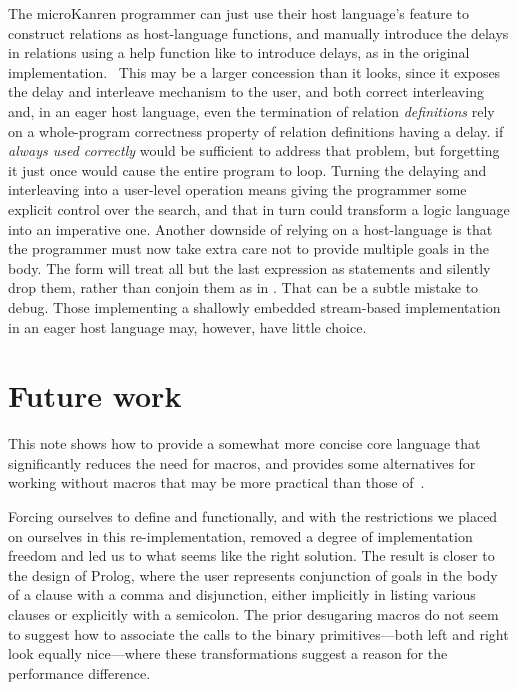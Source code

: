 \documentclass[sigplan,balance,pbalance,natbib=false]{acmart}
\begin{document}
The microKanren programmer can just use their host
language's  feature to construct relations as
host-language functions, and manually introduce the delays in
relations using a help function like  to introduce
delays, as in the original implementation.~\cite{hemann2013muKanren}
This may be a larger concession than it looks, since it exposes the
delay and interleave mechanism to the user, and both correct
interleaving and, in an eager host language, even the termination of
relation \emph{definitions} rely on a whole-program correctness
property of relation definitions having a delay.  if
\emph{always used correctly} would be sufficient to address that
problem, but forgetting it just once would cause the entire program to
loop. Turning the delaying and interleaving into a user-level
operation means giving the programmer some explicit control over the
search, and that in turn could transform a logic language into an
imperative one. Another downside of relying on a
host-language  is that the programmer must now take
extra care not to provide multiple goals in the body.
The  form will treat all but the last expression as
statements and silently drop them, rather than conjoin them as
in . That can be a subtle mistake to debug. Those
implementing a shallowly embedded stream-based implementation in an
eager host language may, however, have little choice.

\section{Future work}\label{sec:conclusion}

This note shows how to provide a somewhat more concise core language
that significantly reduces the need for macros, and provides some
alternatives for working without macros that may be more practical
than those of~\citeauthor{hemann2013muKanren}.

Forcing ourselves to define  and 
functionally, and with the restrictions we placed on ourselves in this
re-implementation, removed a degree of implementation freedom and led
us to what seems like the right solution. The result is closer to the
design of Prolog, where the user represents conjunction of goals in
the body of a clause with a comma and disjunction, either implicitly
in listing various clauses or explicitly with a semicolon. The prior
desugaring macros do not seem to suggest how to associate the calls to
the binary primitives---both left and right look equally nice---where
these transformations suggest a reason for the performance difference.
\end{document}
